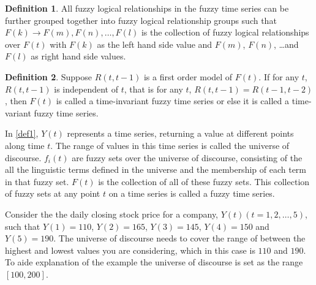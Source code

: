 \documentclass{article}
\theoremstyle{definition}
\newtheorem{ftsdef}{Definition}
\begin{document}
\begin{ftsdef}
\label{def3}
All fuzzy logical relationships in the fuzzy time series can be further grouped together into fuzzy logical relationship groups such that $F(k) \rightarrow F(m), F(n), \ldots, F(l)$ is the collection of fuzzy logical relationships over $F(t)$ with $F(k)$ as the left hand side value and $F(m)$, $F(n)$, \ldots and $F(l)$ as right hand side values.
\end{ftsdef}

\begin{ftsdef}
\label{def4}
Suppose $R(t,t-1)$ is a first order model of $F(t)$. If for any $t$, $R(t,t-1)$ is independent of $t$, that is for any $t$, $R(t,t-1) = R(t-1,t-2)$, then $F(t)$ is called a time-invariant fuzzy time series or else it is called a time-variant fuzzy time series.
\end{ftsdef}

In \cref{def1}, $Y(t)$ represents a time series, returning a value at different points along time $t$. The range of values in this time series is called the universe of discourse. $f_i(t)$ are fuzzy sets over the universe of discourse, consisting of the all the linguistic terms defined in the universe and the membership of each term in that fuzzy set. $F(t)$ is the collection of all of these fuzzy sets. This collection of fuzzy sets at any point $t$ on a time series is called a fuzzy time series.

\begin{center}
\end{center}

Consider the the daily closing stock price for a company, $Y(t)(t=1,2,\ldots,5)$, such that $Y(1) = 110$, $Y(2) = 165$, $Y(3) = 145$, $Y(4) = 150$ and $Y(5) = 190$. The universe of discourse needs to cover the range of between the highest and lowest values you are considering, which in this case is $110$ and $190$. To aide explanation of the example the universe of discourse is set as the range $[100,200]$.
\end{document}
